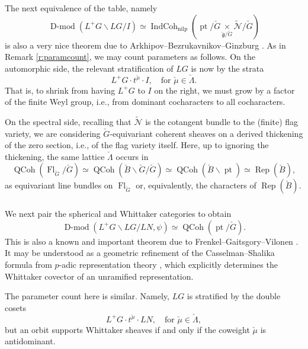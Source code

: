 \documentclass[10pt]{amsart}
\newcommand{\pt}{\on{pt}}
\newcommand{\ICn}{\on{IndCoh}_{\on{nilp}}}
\newcommand{\cB}{\check{B}}
\newcommand{\fg}{\mathfrak{g}}
\newcommand{\on}{\operatorname}
\newcommand{\Dmod}{\on{D-mod}}
\theoremstyle{remark}
\newcommand{\sN}{\mathscr{N}}
\newcommand{\Fl}{\operatorname{Fl}}
\numberwithin{equation}{section}
\newcommand{\cfg}{\check{\fg}}
\newcommand{\cG}{\check{G}}
\newcommand{\QCoh}{\on{QCoh}}
\begin{document}
\subsubsection{} \label{s:abg}The next equivalence of the table, namely
%
\[
   \Dmod(L^+G \backslash LG / I) \simeq \ICn(\pt/\cG \underset {\cfg / \cG} 
   \times \widetilde{\sN} / \cG)
\]
%
is also a very nice theorem due to Arkhipov--Bezrukavnikov--Ginzburg \cite{abg}. As in 
Remark 
\ref{r:paramcount}, we may count parameters as follows. On the automorphic 
side, the relevant stratification of $LG$ is now by the strata
%
\[
     L^+ G \cdot t^{\check{\mu}} \cdot I, \quad \text{for } \check{\mu} \in 
     \check{\Lambda}.
\]
%
That is, to shrink from having $L^+G$ to $I$ on the right, we must grow by a factor of the 
finite Weyl group, i.e., from dominant cocharacters to all cocharacters. 

On the spectral side, recalling that $\widetilde{\sN}$ is the cotangent bundle 
to the (finite) flag variety, we are considering $\cG$-equivariant coherent 
sheaves on a derived thickening of the zero section, i.e., of the flag variety 
itself. Here, up to ignoring the thickening, the same lattice $\check{\Lambda}$ occurs in 
%
\[
   \QCoh( \Fl_{\cG}  / \cG  ) \simeq \QCoh(  \cB \backslash \cG / \cG) \simeq 
   \QCoh( \cB \backslash \pt) \simeq \on{Rep}(\cB), 
\]
%
as  equivariant line bundles on  $\Fl_{\cG}$ or, equivalently, the 
characters of $\on{Rep}(\cB)$. 


\subsubsection{}We next pair the spherical and Whittaker categories to obtain 
%
\[
   \Dmod(L^+G \backslash LG / LN, \psi) \simeq \QCoh( \pt / \cG). 
\]
%
This is also a known and important theorem due to Frenkel--Gaitsgory--Vilonen \cite{fgv}. It may be understood as a geometric refinement of the 
Casselman--Shalika formula from $p$-adic representation theory \cite{cassshalika}, which 
explicitly 
determines the Whittaker covector of an unramified representation. 

The parameter count here is similar. Namely, $LG$ is stratified by the double 
cosets
\[
   L^+G \cdot t^{\check{\mu}} \cdot LN, \quad \text{for } \check{\mu} \in 
   \check{\Lambda}, 
\]
but an orbit supports Whittaker sheaves if and only if the coweight 
$\check{\mu}$ is antidominant. 
\end{document}
